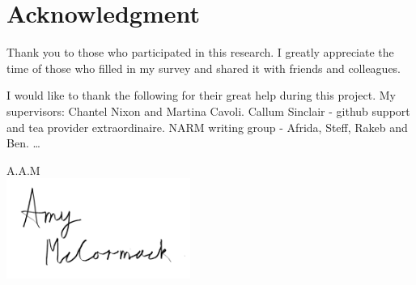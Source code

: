 \section{Acknowledgment}
Thank you to those who participated in this research. I greatly appreciate the time of those who filled in my survey and shared it with friends and colleagues.

I would like to thank the following for their great help during this project. My supervisors: Chantel Nixon and Martina Cavoli. Callum Sinclair - github support and tea provider extraordinaire. NARM writing group - Afrida, Steff, Rakeb and Ben.  \ldots



\begin{flushright}
A.A.M\\[1pc]
\includegraphics[width=6cm]{fig/to use signature png.png}
\end{flushright}
